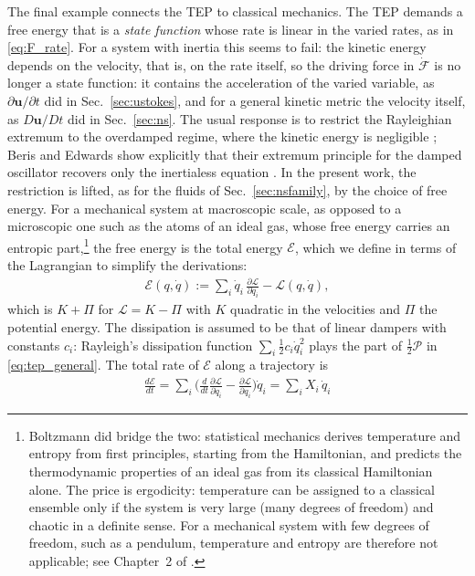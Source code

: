 \documentclass[aip,pof,reprint,amsmath,amssymb,longbibliography]{revtex4-2}
\begin{document}
The final example connects the TEP to classical mechanics. The TEP demands a free energy that is a \textit{state function} whose rate is linear in the varied rates, as in \eqref{eq:F_rate}. For a system with inertia this seems to fail: the kinetic energy depends on the velocity, that is, on the rate itself, so the driving force in $\dot{\mathcal{F}}$ is no longer a state function: it contains the acceleration of the varied variable, as $\partial\boldsymbol{u}/\partial t$ did in Sec.~\ref{sec:ustokes}, and for a general kinetic metric the velocity itself, as $D\boldsymbol{u}/Dt$ did in Sec.~\ref{sec:ns}. The usual response is to restrict the Rayleighian extremum to the overdamped regime, where the kinetic energy is negligible \cite{doi2011, beris2024}; Beris and Edwards show explicitly that their extremum principle for the damped oscillator recovers only the inertialess equation \cite{beris2024}. In the present work, the restriction is lifted, as for the fluids of Sec.~\ref{sec:nsfamily}, by the choice of free energy. For a mechanical system at macroscopic scale, as opposed to a microscopic one such as the atoms of an ideal gas, whose free energy carries an entropic part,\footnote{Boltzmann did bridge the two: statistical mechanics derives temperature and entropy from first principles, starting from the Hamiltonian, and predicts the thermodynamic properties of an ideal gas from its classical Hamiltonian alone. The price is ergodicity: temperature can be assigned to a classical ensemble only if the system is very large (many degrees of freedom) and chaotic in a definite sense. For a mechanical system with few degrees of freedom, such as a pendulum, temperature and entropy are therefore not applicable; see Chapter~2 of \cite{berdichevsky2009}.} the free energy is the total energy $\mathscr{E}$, which we define in terms of the Lagrangian to simplify the derivations:
\begin{align}
    \mathscr{E}(q, \dot{q}) := \sum_i \dot{q}_i\, \frac{\partial \mathscr{L}}{\partial \dot{q}_i} - \mathscr{L}(q, \dot{q}), \label{eq:legendre}
\end{align}
which is $K + \Pi$ for $\mathscr{L} = K - \Pi$ with $K$ quadratic in the velocities and $\Pi$ the potential energy. The dissipation is assumed to be that of linear dampers with constants $c_i$: Rayleigh's dissipation function $\sum_i \tfrac{1}{2} c_i \dot{q}_i^2$ \cite{rayleigh1873} plays the part of $\tfrac{1}{2}\mathcal{P}$ in \eqref{eq:tep_general}. The total rate of $\mathscr{E}$ along a trajectory is
\begin{align}
    \frac{d\mathscr{E}}{dt}
    = \sum_i \Big( \frac{d}{dt}\frac{\partial \mathscr{L}}{\partial \dot{q}_i} - \frac{\partial \mathscr{L}}{\partial q_i} \Big) \dot{q}_i
    = \sum_i X_i\, \dot{q}_i \label{eq:H_rate_legendre}
\end{align}
\end{document}
